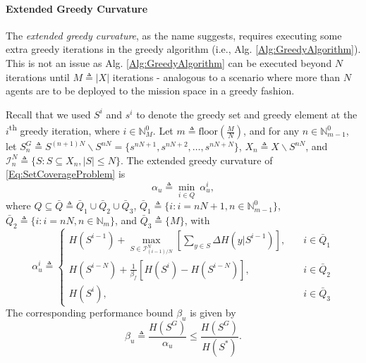 \documentclass[letterpaper, 10 pt, conference]{ieeeconf}
\newcommand{\N}{\mathbb{N}}
\newcommand{\tsup}[1]{\textsuperscript{#1}}
\begin{document}
\paragraph{\textbf{Extended Greedy Curvature \cite{WelikalaJ02021}}}

The \emph{extended greedy curvature}, as the name suggests, requires executing some extra greedy iterations in the greedy algorithm (i.e., Alg. \ref{Alg:GreedyAlgorithm}). This is not an issue as Alg. \ref{Alg:GreedyAlgorithm} can be executed beyond $N$ iterations until $M \triangleq \vert X \vert$ iterations - analogous to a scenario where more than $N$ agents are to be deployed to the mission space in a greedy fashion. 



Recall that we used $S^i$ and $s^i$ to denote the greedy set and greedy element at the $i$\tsup{th} greedy iteration, where $i\in \N_M^0$. Let $m \triangleq \mbox{floor}(\frac{M}{N})$, and for any $n\in \N_{m-1}^0$, let 
$S^G_n \triangleq S^{(n+1)N} \backslash S^{nN} = \{s^{nN+1}, s^{nN+2}, \ldots, s^{nN+N}\}$, $X_n \triangleq X\backslash S^{nN}$, and 
$\mathcal{I}_n^N \triangleq \{S:S \subseteq X_n, \vert S \vert \leq N\}$.
The extended greedy curvature of \eqref{Eq:SetCoverageProblem} is 
\begin{equation}\label{Eq:ExtGreedyCurvatureMeasure}
    \alpha_u \triangleq \min_{i \in Q}\ \alpha^i_u,
\end{equation}
where $Q \subseteq \bar{Q} \triangleq \bar{Q}_1\cup\bar{Q}_2\cup\bar{Q}_3$, $\bar{Q}_1\triangleq\{i: i=nN+1, n\in \N_{m-1}^0\}$, 
$\bar{Q}_2\triangleq\{i: i=nN, n\in \N_m\}$, and 
$\bar{Q}_3\triangleq\{M\}$, with
$$
    \alpha^i_u \triangleq 
    \begin{cases}
     H(S^{i-1}) + \underset{S\in\mathcal{I}^N_{(i-1)/N}}{\max} \left[ \sum_{y\in S} \Delta H(y \vert S^{i-1})\right], \quad &i\in\bar{Q}_1\\
     H(S^{i-N}) + \frac{1}{\beta_f}\left[ H(S^i) - H(S^{i-N}) \right], \quad &i\in\bar{Q}_2\\
     H(S^i), \quad &i\in\bar{Q}_3 
    \end{cases}
$$
The corresponding performance bound $\beta_u$ is given by
\begin{equation}\label{Eq:ExtGreedyCurvatureBoundTheory}
\beta_u \triangleq \frac{H(S^G)}{\alpha_u} \leq \frac{H(S^G)}{H(S^*)}. 
\end{equation}
\end{document}
